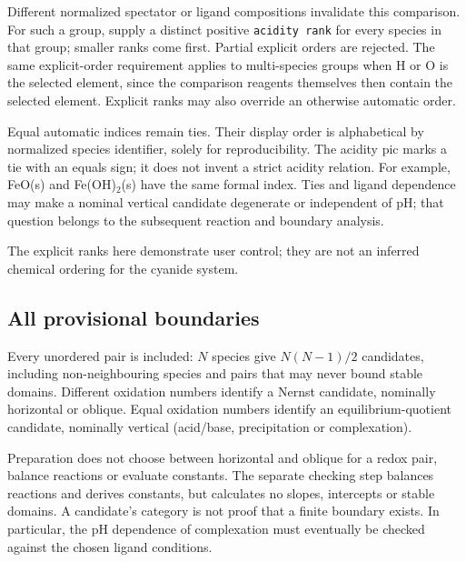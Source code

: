 \documentclass[a4paper,11pt]{ltxdoc}
\begin{document}
Different normalized spectator or ligand compositions invalidate this comparison.
For such a group, supply a distinct positive \texttt{acidity rank} for every
species in that group; smaller ranks come first. Partial explicit orders are
rejected. The same explicit-order requirement applies to multi-species groups
when H or O is the selected element, since the comparison reagents themselves
then contain the selected element. Explicit ranks may also override an otherwise
automatic order.

Equal automatic indices remain ties. Their display order is alphabetical by
normalized species identifier, solely for reproducibility. The acidity pic marks
a tie with an equals sign; it does not invent a strict acidity relation. For
example, FeO(s) and Fe(OH)$_2$(s) have the same formal index. Ties and ligand
dependence may make a nominal vertical candidate degenerate or independent of
pH; that question belongs to the subsequent reaction and boundary analysis.

\begin{codeexample}[width=0pt]
\end{codeexample}
The explicit ranks here demonstrate user control; they are not an inferred
chemical ordering for the cyanide system.

\subsection{All provisional boundaries}
Every unordered pair is included: $N$ species give $N(N-1)/2$ candidates,
including non-neighbouring species and pairs that may never bound stable domains.
Different oxidation numbers identify a Nernst candidate, nominally horizontal
or oblique. Equal oxidation numbers identify an equilibrium-quotient candidate,
nominally vertical (acid/base, precipitation or complexation).

Preparation does not choose between horizontal and oblique for a redox pair,
balance reactions or evaluate constants. The separate checking step balances
reactions and derives constants, but calculates no slopes, intercepts or stable
domains. A candidate's category is not proof that a finite boundary exists.
In particular, the pH dependence of complexation must eventually be checked
against the chosen ligand conditions.
\end{document}

